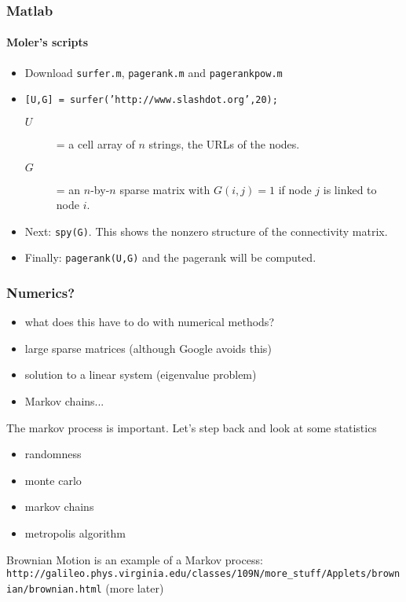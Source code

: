 \documentclass[10pt]{beamer}
\begin{document}
\begin{frame}
\frametitle{Matlab}
\framesubtitle{Moler's scripts}
\begin{itemize}
  \item Download \texttt{surfer.m}, \texttt{pagerank.m} and \texttt{pagerankpow.m}

  \item \texttt{[U,G] = surfer('http://www.slashdot.org',20);}
  \begin{description}
    \item[$U$] = a cell array of $n$ strings, the URLs of the nodes.
    \item[$G$]= an $n$-by-$n$ sparse matrix with $G(i,j)=1$ if node $j$
    is linked to node $i$.
  \end{description}
  \item Next: \texttt{spy(G)}.  This shows the nonzero
structure of the connectivity matrix.
  \item Finally: \texttt{pagerank(U,G)} and the pagerank will
be computed.
\end{itemize}
\end{frame}
\begin{frame}
\frametitle{Numerics?}
\begin{itemize}
  \item what does this have to do with numerical methods?
  \item large sparse matrices (although Google avoids this)
  \item solution to a linear system (eigenvalue problem)
  \item Markov chains...
\end{itemize}
The markov process is important.  Let's step back and look at some
statistics
\begin{itemize}
  \item randomness
  \item monte carlo
  \item markov chains
  \item metropolis algorithm
\end{itemize}
Brownian Motion is an example of a Markov process:
\texttt{http://galileo.phys.virginia.edu/classes/109N/more\_stuff/Applets/brownian/brownian.html} (more later)
\end{frame}
\end{document}
